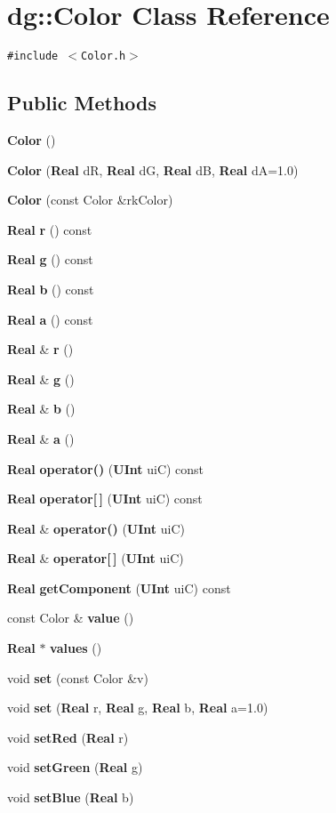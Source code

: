 \section{dg::Color Class Reference}
\label{classdg_1_1Color}
{\tt \#include $<$Color.h$>$}

\subsection*{Public Methods}
\begin{CompactItemize}
\item 
{\bf Color} ()
\item 
{\bf Color} ({\bf Real} d\-R, {\bf Real} d\-G, {\bf Real} d\-B, {\bf Real} d\-A=1.0)
\item 
{\bf Color} (const Color \&rk\-Color)
\item 
{\bf Real} {\bf r} () const
\item 
{\bf Real} {\bf g} () const
\item 
{\bf Real} {\bf b} () const
\item 
{\bf Real} {\bf a} () const
\item 
{\bf Real} \& {\bf r} ()
\item 
{\bf Real} \& {\bf g} ()
\item 
{\bf Real} \& {\bf b} ()
\item 
{\bf Real} \& {\bf a} ()
\item 
{\bf Real} {\bf operator()} ({\bf UInt} ui\-C) const
\item 
{\bf Real} {\bf operator[$\,$]} ({\bf UInt} ui\-C) const
\item 
{\bf Real} \& {\bf operator()} ({\bf UInt} ui\-C)
\item 
{\bf Real} \& {\bf operator[$\,$]} ({\bf UInt} ui\-C)
\item 
{\bf Real} {\bf get\-Component} ({\bf UInt} ui\-C) const
\item 
const Color \& {\bf value} ()
\item 
{\bf Real} $\ast$ {\bf values} ()
\item 
void {\bf set} (const Color \&v)
\item 
void {\bf set} ({\bf Real} r, {\bf Real} g, {\bf Real} b, {\bf Real} a=1.0)
\item 
void {\bf set\-Red} ({\bf Real} r)
\item 
void {\bf set\-Green} ({\bf Real} g)
\item 
void {\bf set\-Blue} ({\bf Real} b)
\item 

\end{CompactItemize}
